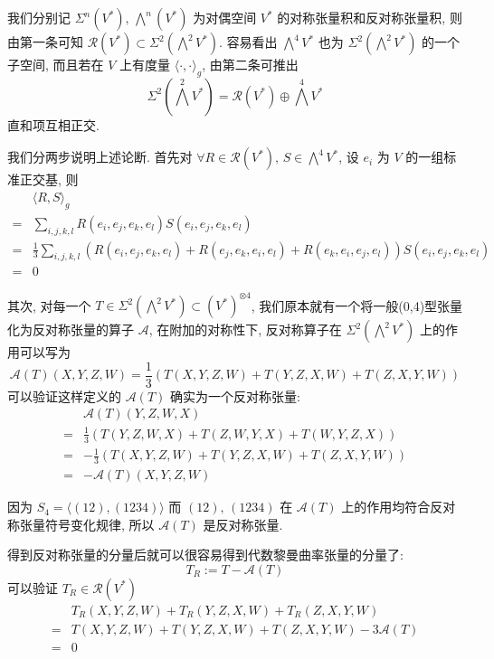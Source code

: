     我们分别记 $\Sigma^n(V^*),\,\bigwedge^n(V^*)$ 为对偶空间 $V^*$ 的对称张量积和反对称张量积, 则由第一条可知 $\mathcal{R}(V^*)\subset\Sigma^2(\bigwedge^2V^*)$.
    容易看出 $\bigwedge^4V^*$ 也为 $\Sigma^2(\bigwedge^2V^*)$ 的一个子空间, 而且若在 $V$ 上有度量 $\langle \cdot,\cdot\rangle_g$, 由第二条可推出
    \begin{equation*}
        \textstyle \Sigma^2(\bigwedge^2V^*) = \mathcal{R}(V^*)\oplus\bigwedge^4V^*
    \end{equation*}
    直和项互相正交.

    我们分两步说明上述论断. 首先对 $\forall R\in\mathcal{R}(V^*),\,S\in\bigwedge^4V^*$, 设 $e_i$ 为 $V$ 的一组标准正交基, 则
    \begin{align*}
        & \langle R,S\rangle_g \\
        = & \sum_{i,j,k,l}R(e_i,e_j,e_k,e_l)S(e_i,e_j,e_k,e_l) \\
        = & \frac{1}{3}\sum_{i,j,k,l}\left(R(e_i,e_j,e_k,e_l) + R(e_j,e_k,e_i,e_l) + R(e_k,e_i,e_j,e_l)\right)S(e_i,e_j,e_k,e_l) \\
        = & 0
    \end{align*}

    其次, 对每一个 $T\in\Sigma^2(\bigwedge^2V^*)\subset(V^*)^{\otimes4}$, 我们原本就有一个将一般(0,4)型张量化为反对称张量的算子 $\mathcal{A}$, 在附加的对称性下, 反对称算子在 $\Sigma^2(\bigwedge^2V^*)$ 上的作用可以写为
    \begin{equation*}
        \mathcal{A}(T)(X,Y,Z,W) = \frac{1}{3}\left(T(X,Y,Z,W) + T(Y,Z,X,W) + T(Z,X,Y,W)\right)
    \end{equation*}
    可以验证这样定义的 $\mathcal{A}(T)$ 确实为一个反对称张量:
    \begin{align*}
        & \mathcal{A}(T)(Y,Z,W,X) \\
        =& \frac{1}{3}\left(T(Y,Z,W,X) + T(Z,W,Y,X) + T(W,Y,Z,X)\right) \\
        =& -\frac{1}{3}\left(T(X,Y,Z,W) + T(Y,Z,X,W) + T(Z,X,Y,W)\right) \\
        =& -\mathcal{A}(T)(X,Y,Z,W)
    \end{align*}
    \begin{remark}
        因为 $S_4 = \langle(12),(1234)\rangle$ 而 $(12),\,(1234)$ 在 $\mathcal{A}(T)$ 上的作用均符合反对称张量符号变化规律, 所以 $\mathcal{A}(T)$ 是反对称张量.
    \end{remark}

    得到反对称张量的分量后就可以很容易得到代数黎曼曲率张量的分量了:
    \begin{equation*}
        T_R := T - \mathcal{A}(T)
    \end{equation*}
    可以验证 $T_R\in\mathcal{R}(V^*)$
    \begin{align*}
        & T_R(X,Y,Z,W) + T_R(Y,Z,X,W) + T_R(Z,X,Y,W) \\
        =& T(X,Y,Z,W) + T(Y,Z,X,W) + T(Z,X,Y,W) - 3\mathcal{A}(T) \\
        =& 0
    \end{align*}

